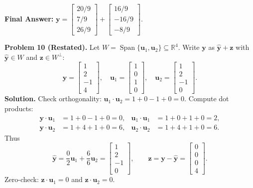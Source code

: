\documentclass[11pt, letterpaper]{article}
\theoremstyle{definition}
\theoremstyle{remark}
\newcommand{\R}{\mathbb{R}}
\begin{document}
\textbf{Final Answer:} $\mathbf{y} = \begin{bmatrix} 20/9 \\ 7/9 \\ 26/9 \end{bmatrix} + \begin{bmatrix} 16/9 \\ -16/9 \\ -8/9 \end{bmatrix}$.

\medskip
\textbf{Problem 10 (Restated).} Let $W = \operatorname{Span}\{\mathbf{u}_1, \mathbf{u}_2\} \subseteq \R^4$. Write $\mathbf{y}$ as $\hat{\mathbf{y}} + \mathbf{z}$ with $\hat{\mathbf{y}} \in W$ and $\mathbf{z} \in W^\perp$:
\[
\mathbf{y} = \begin{bmatrix} 1 \\ 2 \\ -1 \\ 4 \end{bmatrix}, \quad \mathbf{u}_1 = \begin{bmatrix} 1 \\ 0 \\ 1 \\ 0 \end{bmatrix}, \quad \mathbf{u}_2 = \begin{bmatrix} 1 \\ 2 \\ -1 \\ 0 \end{bmatrix}.
\]
\textbf{Solution.}
Check orthogonality: $\mathbf{u}_1 \cdot \mathbf{u}_2 = 1 + 0 - 1 + 0 = 0$. Compute dot products:
\begin{align*}
\mathbf{y} \cdot \mathbf{u}_1 &= 1 + 0 - 1 + 0 = 0, & \mathbf{u}_1 \cdot \mathbf{u}_1 &= 1 + 0 + 1 + 0 = 2, \\
\mathbf{y} \cdot \mathbf{u}_2 &= 1 + 4 + 1 + 0 = 6, & \mathbf{u}_2 \cdot \mathbf{u}_2 &= 1 + 4 + 1 + 0 = 6.
\end{align*}
Thus
\[
\hat{\mathbf{y}} = \frac{0}{2}\mathbf{u}_1 + \frac{6}{6}\mathbf{u}_2 = \begin{bmatrix} 1 \\ 2 \\ -1 \\ 0 \end{bmatrix}, \qquad \mathbf{z} = \mathbf{y} - \hat{\mathbf{y}} = \begin{bmatrix} 0 \\ 0 \\ 0 \\ 4 \end{bmatrix}.
\]
Zero-check: $\mathbf{z} \cdot \mathbf{u}_1 = 0$ and $\mathbf{z} \cdot \mathbf{u}_2 = 0$.
\end{document}
